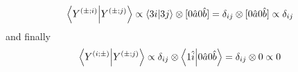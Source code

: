 \documentclass[a4paper,twoside]{article}
\begin{document}
\begin{itemize}
\begin{tcolorbox}[breakable]
\begin{equation}
            \end{equation}
            \begin{equation}
                \bra{Y^{(\pm;i)}} \ket{Y^{(\pm;j)}} \propto \bra{3i} \ket{3j} \otimes [0 \hat{a} 0 \hat{b}] = \delta_{ij} \otimes [0 \hat{a} 0 \hat{b}] \propto \delta_{ij}
            \end{equation}
            and finally
            \begin{equation}
                \bra{Y^{(i;\pm)}} \ket{Y^{(\pm;j)}} \propto \delta_{ij} \otimes \bra{1 \hat{i}}\ket{0 \hat{a} 0 \hat{b}} = \delta_{ij} \otimes 0 \propto 0
            \end{equation}
        \end{tcolorbox}

\end{itemize}
\end{document}

